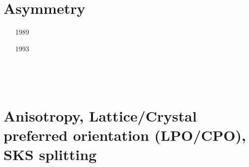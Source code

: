 \section{Asymmetry}
\label{sec:topics:asymmetry}

\begin{small}
\begin{itemize}
\item[1989]
\item[1993]
\item[\twothousandthree]
\item[\twothousandsix]
\item[\twothousandeight]
 \\ 
\item[\twothousandeleven]
\item[\twothousandfourteen]
  \\
\item[\twothousandfifteen]
\item[\twothousandsixteen]
\end{itemize}
\end{small}


\section{Anisotropy, Lattice/Crystal preferred orientation (LPO/CPO), SKS splitting}
\label{sec:topics:anisotropy}

